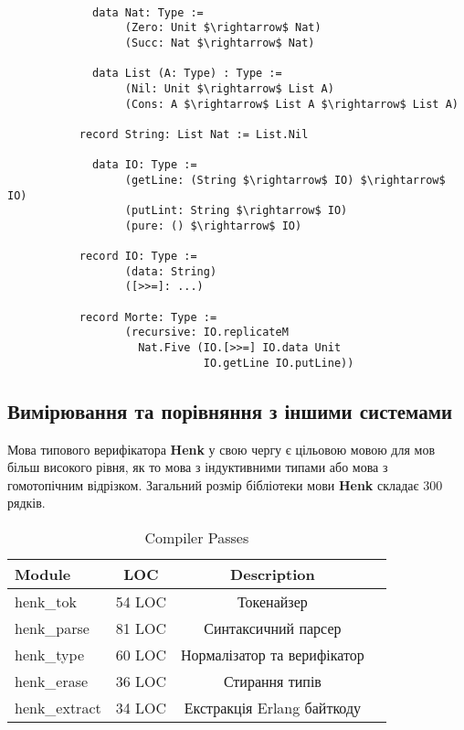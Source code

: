 \documentclass{article}
\begin{document}
\begin{lstlisting}[mathescape=true]

             data Nat: Type :=
                  (Zero: Unit $\rightarrow$ Nat)
                  (Succ: Nat $\rightarrow$ Nat)

             data List (A: Type) : Type :=
                  (Nil: Unit $\rightarrow$ List A)
                  (Cons: A $\rightarrow$ List A $\rightarrow$ List A)

           record String: List Nat := List.Nil

             data IO: Type :=
                  (getLine: (String $\rightarrow$ IO) $\rightarrow$ IO)
                  (putLint: String $\rightarrow$ IO)
                  (pure: () $\rightarrow$ IO)

           record IO: Type :=
                  (data: String)
                  ([>>=]: ...)

           record Morte: Type :=
                  (recursive: IO.replicateM
                    Nat.Five (IO.[>>=] IO.data Unit
                              IO.getLine IO.putLine))

\end{lstlisting}

\subsection{Вимірювання та порівняння з іншими системами}
Мова типового верифікатора \textbf{Henk} у свою чергу є цільовою мовою
для мов більш високого рівня, як то мова з індуктивними типами або мова з гомотопічним відрізком.
Загальний розмір бібліотеки мови \textbf{Henk} складає 300 рядків.

\begin{table}[h]
\begin{center}
\caption{Compiler Passes}
\label{tab:passes}
\begin{tabular}{lccc}
\hline
{\bf Module} & {\bf LOC} & {\bf Description}\\
\hline
henk\_tok     & 54 LOC & Токенайзер\\
henk\_parse   & 81 LOC & Синтаксичний парсер\\
henk\_type    & 60 LOC & Нормалізатор та верифікатор\\
henk\_erase   & 36 LOC & Стирання типів\\
henk\_extract & 34 LOC & Екстракція Erlang байткоду\\
\hline
\end{tabular}
\end{center}
\end{table}
\end{document}
